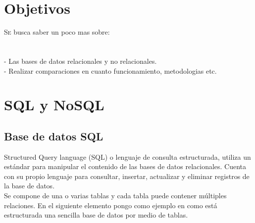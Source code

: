 \documentclass[twoside,twocolumn]{article}
\begin{document}
\section{Objetivos}
\begin{flushright}
\begin{itemize}
\lettrine[nindent=0em,lines=2]{S}e busca saber un poco mas sobre:
\\
\textbf{}\\
\textbf{}\\
- Las bases de datos relacionales y no relacionales.
\textbf{}\\
- Realizar comparaciones en cuanto funcionamiento, metodologias etc.







\section{SQL y NoSQL}

\subsection{Base de datos SQL}

Structured Query language (SQL) o lenguaje de consulta estructurada, utiliza un estándar para manipular el contenido de las bases de datos relacionales. Cuenta con su propio lenguaje para consultar, insertar, actualizar y eliminar registros de la base de datos.\textbf{}\\
Se compone de una o varias tablas y cada tabla puede contener múltiples relaciones. En el siguiente elemento pongo como ejemplo en como está estructurada una sencilla base de datos por medio de tablas.
\textbf{}\\


\end{itemize}
\end{flushright}
\end{document}

